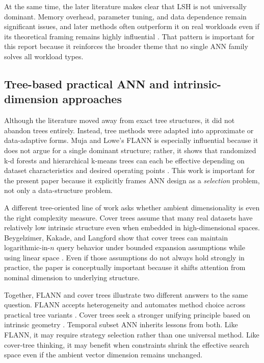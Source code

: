 \documentclass[sigconf,nonacm]{acmart}
\begin{document}
At the same time, the later literature makes clear that LSH is not universally dominant. Memory overhead, parameter tuning, and data dependence remain significant issues, and later methods often outperform it on real workloads even if its theoretical framing remains highly influential \cite{muja2014,jegou2011,fu2019}. That pattern is important for this report because it reinforces the broader theme that no single ANN family solves all workload types.

\subsection{Tree-based practical ANN and intrinsic-dimension approaches}

Although the literature moved away from exact tree structures, it did not abandon trees entirely. Instead, tree methods were adapted into approximate or data-adaptive forms. Muja and Lowe's FLANN is especially influential because it does not argue for a single dominant structure; rather, it shows that randomized k-d forests and hierarchical k-means trees can each be effective depending on dataset characteristics and desired operating points \cite{muja2014}. This work is important for the present paper because it explicitly frames ANN design as a \emph{selection} problem, not only a data-structure problem.

A different tree-oriented line of work asks whether ambient dimensionality is even the right complexity measure. Cover trees assume that many real datasets have relatively low intrinsic structure even when embedded in high-dimensional spaces. Beygelzimer, Kakade, and Langford show that cover trees can maintain logarithmic-in-$n$ query behavior under bounded expansion assumptions while using linear space \cite{beygelzimer2006}. Even if those assumptions do not always hold strongly in practice, the paper is conceptually important because it shifts attention from nominal dimension to underlying structure.

Together, FLANN and cover trees illustrate two different answers to the same question. FLANN accepts heterogeneity and automates method choice across practical tree variants \cite{muja2014}. Cover trees seek a stronger unifying principle based on intrinsic geometry \cite{beygelzimer2006}. Temporal subset ANN inherits lessons from both. Like FLANN, it may require strategy selection rather than one universal method. Like cover-tree thinking, it may benefit when constraints shrink the effective search space even if the ambient vector dimension remains unchanged.
\end{document}
